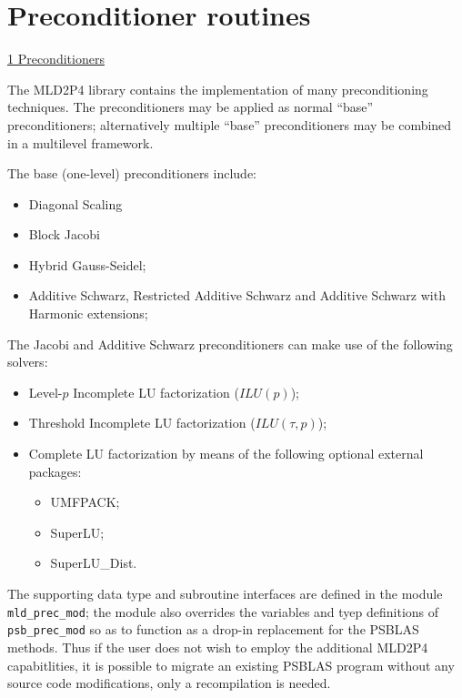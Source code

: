 \section{Preconditioner routines}
\label{sec:precs}
         {\underline{\ref{sec:precs} Preconditioners}}

\label{sec:psprecs}
The MLD2P4 library  contains the implementation of many preconditioning
techniques. The preconditioners may be applied as normal ``base'' 
preconditioners; alternatively multiple ``base'' preconditioners may
be combined  in a multilevel framework. 

The base (one-level) preconditioners include: 
\begin{itemize}
\item Diagonal Scaling
\item Block Jacobi
\item Hybrid Gauss-Seidel;
\item Additive Schwarz, Restricted Additive Schwarz and
  Additive Schwarz with Harmonic extensions;
\end{itemize}
The Jacobi and Additive Schwarz preconditioners can make use of the
following solvers:
\begin{itemize}
\item Level-$p$ Incomplete LU factorization ($ILU(p)$);
\item Threshold Incomplete LU factorization ($ILU(\tau,p)$);
\item Complete LU factorization by means of the following optional
  external   packages: 
\begin{itemize}
\item UMFPACK;
\item SuperLU;
\item SuperLU\_Dist.
\end{itemize}
\end{itemize}

The supporting data type and subroutine interfaces are defined in the
module  \verb|mld_prec_mod|; the module also overrides the variables
and tyep definitions of \verb|psb_prec_mod| so as to function as a
drop-in replacement for the PSBLAS methods. Thus if the user does not
wish to employ the additional MLD2P4 capabitlities, it is possible to
migrate an existing PSBLAS program without any source code
modifications, only a recompilation is needed. 

